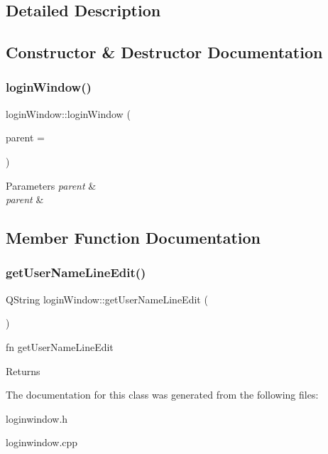 \subsection{Detailed Description}

\begin{DoxyItemize}
\item 
\end{DoxyItemize}

\subsection{Constructor \& Destructor Documentation}
\mbox{\label{classlogin_window_ad6f2de3f9d45e1f951a2eb2eeed9747e}} 
\subsubsection{\texorpdfstring{login\+Window()}{loginWindow()}}
{\footnotesize\ttfamily login\+Window\+::login\+Window (\begin{DoxyParamCaption}\item[{Q\+Widget $\ast$}]{parent = {} }\end{DoxyParamCaption})\hspace{0.3cm}{\ttfamily [explicit]}}


\begin{DoxyItemize}
\item 
\begin{DoxyParams}{Parameters}
{\em parent} & \\
\hline
{\em parent} & \\
\hline
\end{DoxyParams}

\end{DoxyItemize}

\subsection{Member Function Documentation}
\mbox{\label{classlogin_window_ae0670d5971676277b8d093e0396b4cb1}} 
\subsubsection{\texorpdfstring{get\+User\+Name\+Line\+Edit()}{getUserNameLineEdit()}}
{\footnotesize\ttfamily Q\+String login\+Window\+::get\+User\+Name\+Line\+Edit (\begin{DoxyParamCaption}{ }\end{DoxyParamCaption})}

fn get\+User\+Name\+Line\+Edit \begin{DoxyReturn}{Returns}

\end{DoxyReturn}


The documentation for this class was generated from the following files\+:\begin{DoxyCompactItemize}
\item 
loginwindow.\+h\item 
loginwindow.\+cpp\end{DoxyCompactItemize}
